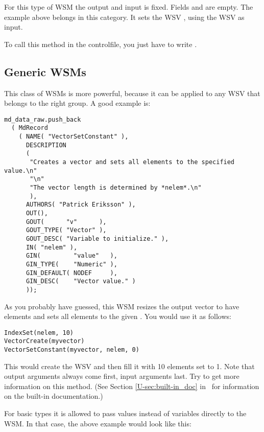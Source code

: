 For this type of WSM the output and input is fixed. Fields
 and  are empty. The example
above belongs in this category. It sets the WSV , using
the WSV  as input.

To call this method in the controlfile, you just have to write
.

\subsection{Generic WSMs}

This class of WSMs is more powerful, because it can be applied to any
WSV that belongs to the right group. A good example is:

\begin{lstlisting}
md_data_raw.push_back
  ( MdRecord
    ( NAME( "VectorSetConstant" ),
      DESCRIPTION
      (
       "Creates a vector and sets all elements to the specified value.\n"
       "\n"
       "The vector length is determined by *nelem*.\n"
       ),
      AUTHORS( "Patrick Eriksson" ),
      OUT(),
      GOUT(      "v"      ),
      GOUT_TYPE( "Vector" ),
      GOUT_DESC( "Variable to initialize." ),
      IN( "nelem" ),
      GIN(         "value"   ),
      GIN_TYPE(    "Numeric" ),
      GIN_DEFAULT( NODEF     ),
      GIN_DESC(    "Vector value." )
      ));
\end{lstlisting}

\noindent
As you probably have guessed, this WSM resizes the output vector to have  elements and sets all elements to the given .
You would use it as follows:

\begin{lstlisting}
IndexSet(nelem, 10)
VectorCreate(myvector)
VectorSetConstant(myvector, nelem, 0)
\end{lstlisting}

\noindent
This would create the WSV  and then fill it with
10 elements set to 1. Note that output arguments always come first,
input arguments last. Try  to get
more information on this method. (See Section
\ref{U-sec:built-in_doc} in \user\ for information on the built-in
documentation.)

\noindent
For basic types it is allowed to pass values instead of variables directly to
the WSM. In that case, the above example would look like this:

